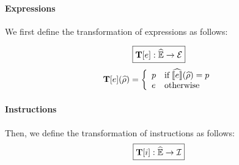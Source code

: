 \paragraph{Expressions} We first define the transformation of expressions as
follows:

\[
  \framebox{$\transform{\expr}: \aenvset \rightarrow \exprset$}
\]
\[
  \textbf{T}[e](\widehat{\rho}) = \left\{
    \begin{array}{ll}
      p & \text{if} \; \widehat{\llbracket{e}\rrbracket}(\widehat{\rho}) = p\\
      e & \text{otherwise}\\
    \end{array}
  \right.
\]

\paragraph{Instructions} Then, we define the transformation of instructions
as follows:
\[
  \framebox{$\transform{\inst}: \aenvset \rightarrow \instset$}
\]

